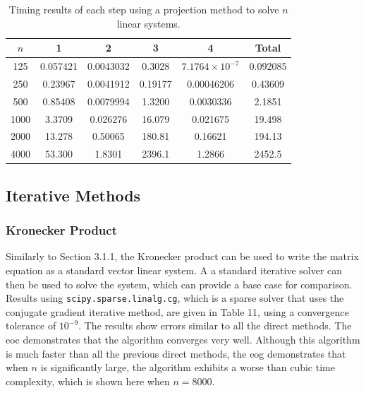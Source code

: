 \documentclass{article}
\numberwithin{equation}{section}
\begin{document}
\begin{table}[H]
\centering
\begin{tabular}{|c|c|c|c|c|c|}
\hline
$n$ & 1 & 2 & 3 & 4 & Total \\
\hline
125 & 0.057421 & 0.0043032 & 0.3028 & $7.1764 \times 10^{-7}$ & 0.092085 \\
250 & 0.23967 & 0.0041912 & 0.19177 & 0.00046206 & 0.43609  \\
500 & 0.85408 & 0.0079994 & 1.3200 & 0.0030336 & 2.1851 \\
1000 & 3.3709 & 0.026276 & 16.079 & 0.021675 & 19.498 \\
2000 & 13.278 & 0.50065 & 180.81 & 0.16621 & 194.13 \\
4000 & 53.300 & 1.8301 & 2396.1 & 1.2866 & 2452.5  \\
\hline
\end{tabular}
\captionsetup{justification=centering}
\caption{Timing results of each step using a projection method to solve $n$ linear systems.}
\end{table}

\subsection{Iterative Methods}

\subsubsection{Kronecker Product}
Similarly to Section 3.1.1, the Kronecker product can be used to write the matrix equation as a standard vector linear system. A a standard iterative solver can then be used to solve the system, which can provide a base case for comparison. Results using \texttt{scipy.sparse.linalg.cg}, which is a sparse solver that uses the conjugate gradient iterative method, are given in Table 11, using a convergence tolerance of $10^{-9}$. The results show errors similar to all the direct methods. The eoc demonstrates that the algorithm converges very well. Although this algorithm is much faster than all the previous direct methods, the eog demonstrates that when $n$ is significantly large, the algorithm exhibits a worse than cubic time complexity, which is shown here when $n=8000$.  
\end{document}
